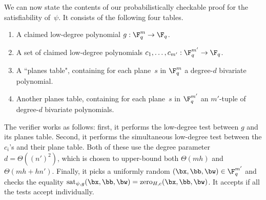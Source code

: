 We can now state the contents of our probabilistically checkable proof for the satisfiability of~$\psi$.
It consists of the following four tables.
\begin{enumerate}
\itemsep -.5pt
\item A claimed low-degree polynomial $g:\F_q^m \rightarrow \F_q$.
\item A set of claimed low-degree polynomials $c_1, \ldots, c_{m'} : \F_q^{m'} \rightarrow \F_q$.
\item A ``planes table", containing for each plane~$s$ in $\F_q^m$ a degree-$d$ bivariate polynomial.
\item Another planes table, containing for each plane~$s$ in $\F_q^{m'}$ an $m'$-tuple of degree-$d$ bivariate polynomials.
\end{enumerate}
The verifier works as follows:
first, it performs the low-degree test between $g$ and its planes table.
Second, it performs the simultaneous low-degree test between the $c_i$'s and their plane table.
Both of these use the degree parameter $d = \Theta((n')^2)$,
which is chosen to upper-bound both $\Theta(mh)$ and $\Theta(mh + hn')$.
Finally, it picks a uniformly random $(\bx, \bb, \bw) \in \F_q^{m'}$
and checks the equality $\mathrm{sat}_{\psi,g}(\bx, \bb, \bw) = \mathrm{zero}_{H,c}(\bx, \bb, \bw)$.
It accepts if all the tests accept individually.

